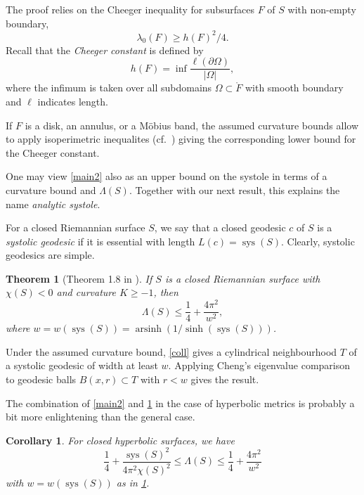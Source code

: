 \documentclass[a4paper,11pt]{amsart}
\numberwithin{equation}{section}
\newtheorem{cor}[equation]{Corollary}
\newtheorem{thm}[equation]{Theorem}
\theoremstyle{definition}
\DeclareMathOperator{\arsinh}{arsinh}
\DeclareMathOperator{\sys}{sys}
\begin{document}
The proof relies on the Cheeger inequality for subsurfaces $F$ of $S$ with non-empty boundary,
\begin{equation*}
\lambda_0(F) \geq h(F)^2/4.
\end{equation*}
Recall that the \emph{Cheeger constant} is defined by
\begin{equation*}
h(F)=\inf \frac{\ell(\partial \Omega)}{|\Omega|},
\end{equation*}
where the infimum is taken over all subdomains $\Omega \subset \mathring F$ with smooth boundary and $\ell$ indicates length.

If $F$ is a disk, an annulus, or a M\"obius band, the assumed curvature bounds allow to apply isoperimetric inequalites (cf.\ \cite[Corollary 2.2]{BMM3}) giving the corresponding lower bound for the Cheeger constant.

One may view \cref{main2} also as an upper bound on the systole
in terms of a curvature bound and $\Lambda(S).$
Together with our next result, this explains the name \emph{analytic systole}.

For a closed Riemannian surface $S$, we say that a closed geodesic $c$ of $S$
is a \emph{systolic geodesic} if it is essential with length $L(c)=\sys(S)$.
Clearly, systolic geodesics are simple.

\begin{thm}[Theorem 1.8 in \cite{BMM3}]\label{esansy}
If $S$ is a closed Riemannian surface with $\chi(S)<0$ and curvature $K\ge-1$, then
\begin{equation*}
  \Lambda(S) \le \frac{1}{4} + \frac{4\pi^2}{w^2},
\end{equation*}
where $w=w(\sys(S))=\arsinh(1/\sinh(\sys(S)))$.
\end{thm}

Under the assumed curvature bound, \cref{coll} gives a cylindrical neighbourhood $T$ of a systolic geodesic of width at least $w$.
Applying Cheng's eigenvalue comparison to geodesic balls $B(x,r) \subset T$ with $r<w$ gives the result.

The combination of \cref{main2} and \cref{esansy} in the case of hyperbolic metrics 
is probably a bit more enlightening than the general case.

\begin{cor}\label{syshype}
For closed hyperbolic surfaces, we have
\begin{equation*}
  \frac{1}4 + \frac{\sys(S)^2}{4\pi^2\chi(S)^2}
  \le \Lambda(S)
  \le \frac{1}4 + \frac{4\pi^2}{w^2}
\end{equation*}
with $w=w(\sys(S))$ as in \cref{esansy}.
\end{cor}
\end{document}
